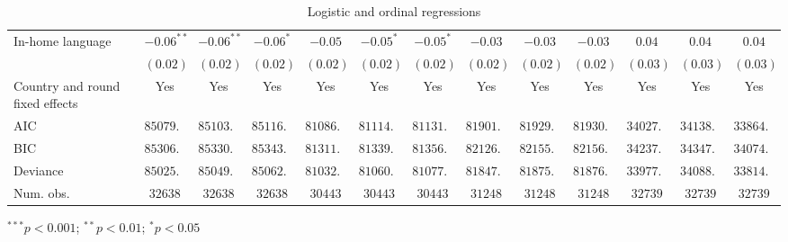 \begin{table}
\begin{center}
\begin{threeparttable}
\begin{tabular}{l c c c c c c c c c c c c}
In-home language                & $-0.06^{**}$  & $-0.06^{**}$  & $-0.06^{*}$   & $-0.05$       & $-0.05^{*}$   & $-0.05^{*}$   & $-0.03$       & $-0.03$       & $-0.03$       & $0.04$        & $0.04$        & $0.04$        \\
                                & $(0.02)$      & $(0.02)$      & $(0.02)$      & $(0.02)$      & $(0.02)$      & $(0.02)$      & $(0.02)$      & $(0.02)$      & $(0.02)$      & $(0.03)$      & $(0.03)$      & $(0.03)$      \\
\midrule
Country and round fixed effects & Yes           & Yes           & Yes           & Yes           & Yes           & Yes           & Yes           & Yes           & Yes           & Yes           & Yes           & Yes           \\
AIC                             & $85079.57$    & $85103.89$    & $85116.65$    & $81086.61$    & $81114.79$    & $81131.78$    & $81901.24$    & $81929.65$    & $81930.65$    & $34027.83$    & $34138.09$    & $33864.24$    \\
BIC                             & $85306.18$    & $85330.51$    & $85343.27$    & $81311.35$    & $81339.53$    & $81356.52$    & $82126.68$    & $82155.09$    & $82156.10$    & $34237.74$    & $34347.99$    & $34074.15$    \\
Deviance                        & $85025.57$    & $85049.89$    & $85062.65$    & $81032.61$    & $81060.79$    & $81077.78$    & $81847.24$    & $81875.65$    & $81876.65$    & $33977.83$    & $34088.09$    & $33814.24$    \\
Num. obs.                       & $32638$       & $32638$       & $32638$       & $30443$       & $30443$       & $30443$       & $31248$       & $31248$       & $31248$       & $32739$       & $32739$       & $32739$       \\
\bottomrule
\end{tabular}
\begin{tablenotes}[flushleft]
\scriptsize{\item $^{***}p<0.001$; $^{**}p<0.01$; $^{*}p<0.05$}
\end{tablenotes}
\end{threeparttable}
\caption{Logistic and ordinal regressions}
\label{table:coefficients}
\end{center}
\end{table}

